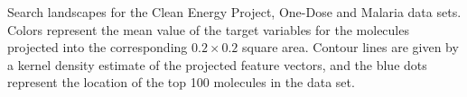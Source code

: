 Search landscapes for the Clean Energy Project, One-Dose and Malaria data sets.  
Colors represent the mean value of the target variables for the molecules projected into the corresponding $0.2 \times 0.2$ square area. Contour lines are given by a kernel density estimate of the projected feature vectors, and the blue dots represent the location of the top 100 molecules in the data set.
\label{fig:info_landscapes}